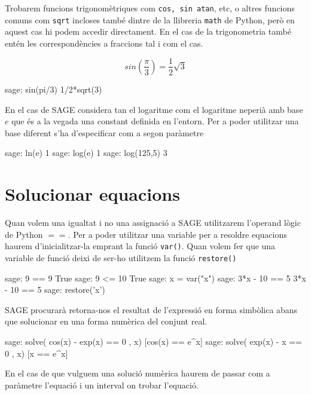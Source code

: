 Trobarem funcions trigonomètriques com {\tt cos, sin atan}, etc, o altres funcions comuns com {\tt sqrt} incloses també dintre de la llibreria {\tt math} de Python, però en aquest cas hi podem accedir directament. En el cas de la trigonometria també entén les correspondències a fraccions tal i com el cas.

\[
sin(\frac{\pi}{3}) = \frac{1}{2}\sqrt{3}
\]

\begin{blockcode}
sage: sin(pi/3)
1/2*sqrt(3)
\end{blockcode}



En el cas de SAGE considera tan el logaritme com el logaritme neperià amb base $e$ que és a la vegada una constant definida en l'entorn. Per a poder utilitzar una base diferent s'ha d'especificar com a segon paràmetre

\begin{blockcode}
sage: ln(e)
1
sage: log(e)
1
sage: log(125,5)
3
\end{blockcode}




\section{Solucionar equacions}

Quan volem una igualtat i no una assignació a SAGE utilitzarem l'operand lògic de Python $==$. Per a poder utilitzar una variable per a resoldre equacions haurem d'inicialitzar-la emprant la funció {\tt var()}. Quan volem fer que una variable de funció deixi de ser-ho utilitzem la funció {\tt restore()}

\begin{blockcode}
sage: 9 == 9
True
sage: 9 <= 10
True
sage: x = var("x")
sage: 3*x - 10 == 5
3*x - 10 == 5
sage: restore('x')
\end{blockcode}

SAGE procurarà retorna-nos el resultat de l'expressió en forma simbòlica abans que solucionar en una forma numèrica del conjunt real.

\begin{blockcode}
sage: solve( cos(x) - exp(x) == 0 , x)
[cos(x) == e^x]
sage: solve( exp(x) - x == 0 , x)
[x == e^x]
\end{blockcode}

En el cas de que vulguem una solució numèrica haurem de passar com a paràmetre l'equació i un interval on trobar l'equació.


